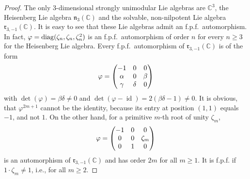 \documentclass[12pt]{amsart}
\theoremstyle{definition}
\theoremstyle{remark}
\DeclareMathOperator{\id}{id}
\newcommand{\C}{\mathbb{C}}
\newcommand{\diag}{\mathop{\rm diag}}
\newcommand{\Ln}{\mathfrak{n}}
\newcommand{\Lr}{\mathfrak{r}}
\newcommand{\al}{\alpha}
\newcommand{\be}{\beta}
\newcommand{\ga}{\gamma}
\newcommand{\de}{\delta}
\renewcommand{\phi}{\varphi}
\begin{document}
\begin{proof}
The only $3$-dimensional strongly unimodular Lie algebras are $\C^3$, the Heisenberg Lie algebra
$\Ln_3(\C)$ and the solvable, non-nilpotent Lie algebra $\Lr_{3,-1}(\C)$. It is easy to see that these
Lie algebras admit an f.p.f.\ automorphism. In fact,
$\phi=\diag (\zeta_n,\zeta_n,\zeta_n^2)$ is an f.p.f.\ automorphism of order $n$ for every $n\ge 3$ for the
Heisenberg Lie algebra. Every f.p.f.\ automorphism of $\Lr_{3,-1}(\C)$ is of the form
\[
\phi=\begin{pmatrix} -1 & 0 & 0 \cr \al & 0 & \be \cr \ga & \de & 0 \end{pmatrix}
\]
with $\det(\phi)=\be\de\neq 0$ and $\det(\phi-\id)=2(\be\de-1)\neq 0$. It is obvious, that $\phi^{2m+1}$
cannot be the identity, because its entry at position $(1,1)$ equals $-1$, and not $1$.
On the other hand, for a primitive $m$-th root of unity $\zeta_m$,
\[
\phi=\begin{pmatrix} -1 & 0 & 0 \cr 0 & 0 & \zeta_m \cr 0 & 1 & 0 \end{pmatrix}
\]
is an automorphism of $\Lr_{3,-1}(\C)$ and has order $2m$ for all $m\ge 1$. It is f.p.f. if $1\cdot \zeta_m\neq 1$,
i.e., for all $m\ge 2$.
\end{proof}
\end{document}
